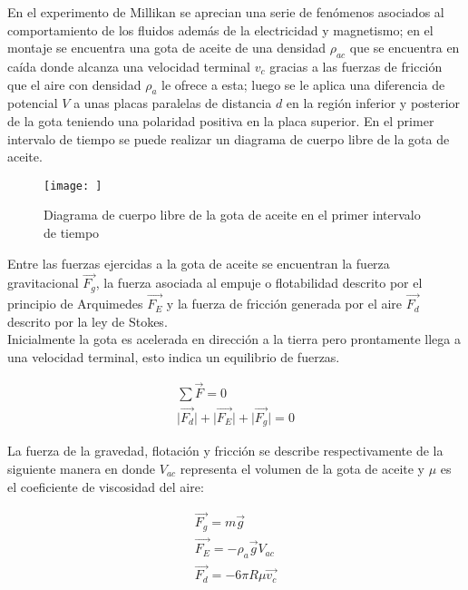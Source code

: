 En el experimento de Millikan se aprecian una serie de fenómenos asociados al comportamiento de los fluidos además de la electricidad y magnetismo; en el montaje se encuentra una gota de aceite de una densidad $\rho_{ac}$ que se encuentra en caída donde alcanza una velocidad terminal $v_c$ gracias a las fuerzas de fricción que el aire con densidad $\rho_a$ le ofrece a esta; luego se le aplica una diferencia de potencial $V$ a unas placas paralelas de distancia $d$ en la región inferior y posterior de la gota teniendo una polaridad positiva en la placa superior. En el primer intervalo de tiempo se puede realizar un diagrama de cuerpo libre de la gota de aceite.\\

\begin{figure}
    \centering
    \texttt{[image: ]}
    \caption{Diagrama de cuerpo libre de la gota de aceite en el primer intervalo de tiempo}
    \label{fig:enter-label}
\end{figure}

Entre las fuerzas ejercidas a la gota de aceite se encuentran la fuerza gravitacional $\Vec{F_g}$, la fuerza asociada al empuje o flotabilidad descrito por el principio de Arquimedes $\Vec{F_E}$ y la fuerza de fricción generada por el aire $\Vec{F_d}$ descrito por la ley de Stokes.\\

Inicialmente la gota es acelerada en dirección a la tierra pero prontamente llega a una velocidad terminal, esto indica un equilibrio de fuerzas.

\begin{equation}
    \begin{split}
        \sum \Vec{F}=0\\
        \lvert \Vec{F_d}\rvert + \lvert\Vec{F_E}\rvert + \lvert \Vec{F_g}\rvert =0
    \end{split}
\end{equation}

La fuerza de la gravedad, flotación y fricción se describe respectivamente de la siguiente manera en donde $V_{ac}$ representa el volumen de la gota de aceite y $\mu$ es el coeficiente de viscosidad del aire:

\begin{equation}
    \begin{split}
        \Vec{F_g}=m\Vec{g}\\
        \Vec{F_E}=-\rho_a \Vec{g}V_{ac}\\
        \Vec{F_d}=-6\pi R\mu \Vec{v_c}
    \end{split}
\end{equation}

